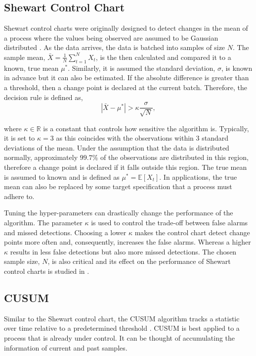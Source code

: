 \subsection{Shewart Control Chart}
Shewart control charts were originally designed to detect changes in the mean of a process where the values being observed are assumed to be Gaussian distributed \cite{shewhart1931economic}. As the data arrives, the data is batched into samples of size $N$. The sample mean, $\bar{X}=\frac{1}{N} \sum_{t=1}^N X_t$, is the then calculated and compared it to a known, true mean $\mu^*$.  Similarly, it is assumed the standard deviation, $\sigma$, is known in advance but it can also be estimated. If the absolute difference is greater than a threshold, then a change point is declared at the current batch. Therefore, the decision rule is defined as,
\begin{equation}
|\bar{X}-\mu^*| > \kappa \frac{\sigma}{\sqrt{N}},
\end{equation}

where $\kappa \in \mathbb{R}$ is a constant that controls how sensitive the algorithm is. Typically, it is set to $\kappa=3$ as this coincides with the observations within $3$ standard deviations of the mean. Under the assumption that the data is distributed normally,  approximately $99.7\%$ of the observations are distributed in this region, therefore a change point is declared if it falls outside this region. The true mean is assumed to known and is defined as $\mu^* = \mathbb{E}[X_t]$. In applications, the true mean can also be replaced by some target specification that a process must adhere to.

Tuning the hyper-parameters can drastically change the performance of the algorithm. The parameter $\kappa$ is used to control the trade-off between false alarms and missed detections. Choosing a lower $\kappa$ makes the control chart detect change points more often and, consequently, increases the false alarms. Whereas a higher $\kappa$ results in less false detections but also more missed detections. The chosen sample size, $N$, is also critical and its effect on the performance of Shewart control charts is studied in \cite{haridy2017effect}.

\subsection{CUSUM}
\label{cusum}
Similar to the Shewart control chart, the CUSUM algorithm tracks a statistic over time relative to a predetermined threshold \cite{page1954continuous}. CUSUM is best applied to a process that is already under control. It can be thought of accumulating the information of current and past samples. 

